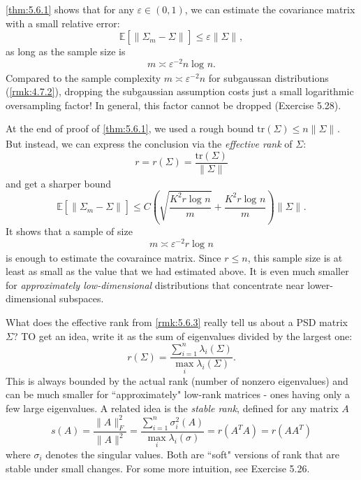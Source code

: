 \begin{remark}
\label{rmk:5.6.2}
\cref{thm:5.6.1} shows that for any $\varepsilon \in (0, 1)$, we can estimate the covariance matrix with a 
small relative error: 
\[ \mathbb{E}\left[ \lVert \Sigma_m - \Sigma \rVert_{} \right] \leq \varepsilon \lVert \Sigma \rVert_{}, \]
as long as the sample size is 
\[ m \asymp \varepsilon^{-2} n \log_{}{n}. \]
Compared to the sample complexity $m \asymp \varepsilon^{-2}n$ for subgaussan distributions (\cref{rmk:4.7.2}), 
dropping the subgaussian assumption costs just a small logarithmic oversampling factor! In general, this factor 
cannot be dropped (Exercise 5.28).
\end{remark}

\begin{remark}
\label{rmk:5.6.3}
At the end of proof of \cref{thm:5.6.1}, we used a rough bound $\mathrm{tr}(\Sigma) \leq n \lVert \Sigma 
\rVert_{}$. But instead, we can express the conclusion via the \textit{effective rank} of $\Sigma$:
\[ r = r(\Sigma) = \frac{\mathrm{tr}(\Sigma)}{\lVert \Sigma \rVert_{}} \]
and get a sharper bound 
\[ \mathbb{E}\left[ \lVert \Sigma_m - \Sigma \rVert_{} \right] \leq C \left( 
\sqrt{\frac{K^2 r \log_{}{n}}{m}} + \frac{K^2 r \log_{}{n}}{m} \right) \lVert \Sigma \rVert_{}. \]
It shows that a sample of size 
\[ m \asymp \varepsilon^{-2} r \log_{}{n} \]
is enough to estimate the covaraince matrix. Since $r \leq n$, this sample size is at least as small as the 
value that we had estimated above. It is even much smaller for \textit{approximately low-dimensional} 
distributions that concentrate near lower-dimensional subspaces.
\end{remark}

\begin{remark}
\label{rmk:5.6.4}
What does the effective rank from \cref{rmk:5.6.3} really tell us about a PSD matrix $\Sigma$? TO get an idea, 
write it as the sum of eigenvalues divided by the largest one:
\[ r(\Sigma) = \frac{\sum_{i = 1}^{n} \lambda_i(\Sigma)}{\max_{i} \lambda_i(\Sigma)}. \]
This is always bounded by the actual rank (number of nonzero eigenvalues) and can be much smaller for 
``approximately" low-rank matrices - ones having only a few large eigenvalues. A related idea is the 
\textit{stable rank}, defined for any matrix $A$
\[ s(A) = \frac{\lVert A \rVert_{F}^2}{\lVert A \rVert_{}^2} 
= \frac{\sum_{i = 1}^{n} \sigma_i^2(A)}{\max_{i} \lambda_i(\sigma)} = r(A^T A) = r(AA^T) \]
where $\sigma_i$ denotes the singular values. Both are ``soft" versions of rank that are stable under small 
changes. For some more intuition, see Exercise 5.26.
\end{remark}

